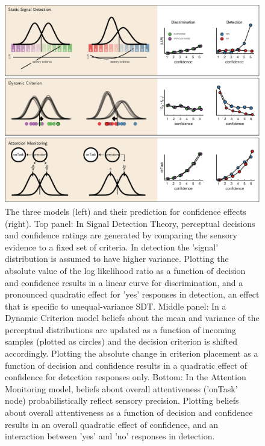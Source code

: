 \documentclass[12pt,twoside]{reedthesis}
\begin{document}
\begin{figure}
\includegraphics[width=\linewidth]{figure/ch3/models} \caption[Computational models, imaging experiment]{The three models (left) and their prediction for confidence effects (right). Top panel: In Signal Detection Theory, perceptual decisions and confidence ratings are generated by comparing the sensory evidence to a fixed set of criteria. In detection the ’signal’ distribution is assumed to have higher variance. Plotting the absolute value of the log likelihood ratio as a function of decision and confidence results in a linear curve for discrimination, and a pronounced quadratic effect for 'yes' responses in detection, an effect that is specific to unequal-variance SDT. Middle panel: In a Dynamic Criterion model beliefs about the mean and variance of the perceptual distributions are updated as a function of incoming samples (plotted as circles) and the decision criterion is shifted accordingly. Plotting the absolute change in criterion placement as a function of decision and confidence results in a quadratic effect of confidence for detection responses only. Bottom: In the Attention Monitoring model, beliefs about overall attentiveness (’onTask’ node) probabilistically reflect sensory precision. Plotting beliefs about overall attentiveness as a function of decision and confidence results in an overall quadratic effect of confidence, and an interaction between 'yes' and 'no' responses in detection.}\label{fig:ch3-exp1-models}
\end{figure}
\end{document}
